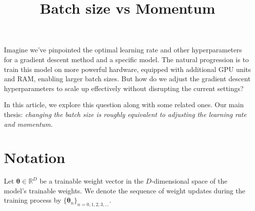 \documentclass[12pt,a4paper]{amsart}
\numberwithin{equation}{section}
\theoremstyle{remark}
\begin{document}
\title{Batch size vs Momentum}
\maketitle

Imagine we've pinpointed the optimal learning rate and other hyperparameters
for a gradient descent method and a specific model.
The natural progression is to train this model on more powerful hardware,
equipped with additional GPU units and RAM, enabling larger batch sizes.
But how do we adjust the gradient descent hyperparameters
to scale up effectively without disrupting the current settings?

In this article,
we explore this question along with some related ones.
Our main thesis:
\emph{changing the batch size is roughly equivalent to adjusting the learning rate and momentum.}



%
%
%
%


\section{Notation}

Let
$\boldsymbol\theta \in \mathbb{R}^D$
be a trainable weight vector in the $D$-dimensional space of the model's trainable weights.
We denote the sequence of weight updates during the training process by
$\{\boldsymbol\theta_n\}_{n = 0,1,2,3,\ldots}$.
\end{document}
